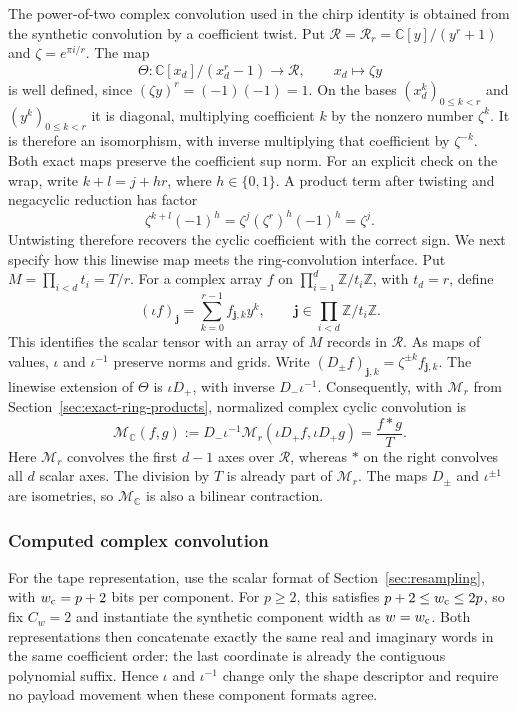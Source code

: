 The power-of-two complex convolution used in the chirp identity is
obtained from the synthetic convolution by a coefficient twist.
Put $\mathcal R=\mathcal R_r=\mathbb C[y]/(y^r+1)$ and
$\zeta=e^{\pi i/r}$.  The map
\[
 \Theta:\mathbb C[x_d]/(x_d^r-1)\longrightarrow\mathcal R,
 \qquad x_d\longmapsto\zeta y
\]
is well defined, since $(\zeta y)^r=(-1)(-1)=1$.  On the bases
$(x_d^k)_{0\le k<r}$ and $(y^k)_{0\le k<r}$ it is diagonal,
multiplying coefficient $k$ by the nonzero number $\zeta^k$.  It is therefore an
isomorphism, with inverse multiplying that coefficient by
$\zeta^{-k}$.  Both exact maps preserve the coefficient sup norm.
For an explicit check on the wrap, write $k+l=j+hr$, where
$h\in\{0,1\}$.  A product term after twisting and negacyclic reduction
has factor
\[
 \zeta^{k+l}(-1)^h=\zeta^j(\zeta^r)^h(-1)^h=\zeta^j.
\]
Untwisting therefore recovers the cyclic coefficient with the correct
sign.  We next specify how this linewise map meets the ring-convolution
interface.  Put $M=\prod_{i<d}t_i=T/r$.  For a complex array $f$ on
$\prod_{i=1}^d\mathbb Z/t_i\mathbb Z$, with $t_d=r$, define
\[
 (\iota f)_{\boldsymbol j}
   =\sum_{k=0}^{r-1}f_{\boldsymbol j,k}y^k,
 \qquad
 \boldsymbol j\in\prod_{i<d}\mathbb Z/t_i\mathbb Z.
\]
This identifies the scalar tensor with an array of $M$ records in
$\mathcal R$. As maps of values, $\iota$ and $\iota^{-1}$ preserve norms
and grids. Write
$(D_\pm f)_{\boldsymbol j,k}=\zeta^{\pm k}f_{\boldsymbol j,k}$.
The linewise extension of $\Theta$ is $\iota D_+$, with inverse
$D_-\iota^{-1}$.  Consequently, with $\mathcal M_r$ from
Section~\ref{sec:exact-ring-products}, normalized complex cyclic
convolution is
\[
 \mathcal M_{\mathbb C}(f,g)
   :=D_-\iota^{-1}
       \mathcal M_r(\iota D_+f,\iota D_+g)
    =\frac{f*g}{T}.
\]
Here $\mathcal M_r$ convolves the first $d-1$ axes over $\mathcal R$,
whereas $*$ on the right convolves all $d$ scalar axes.  The division
by $T$ is already part of $\mathcal M_r$.  The maps $D_\pm$ and
$\iota^{\pm1}$ are isometries, so $\mathcal M_{\mathbb C}$ is also a
bilinear contraction.

\subsubsection{Computed complex convolution}

For the tape representation, use the scalar format of
Section~\ref{sec:resampling}, with $w_{\rm c}=p+2$ bits per component.
For $p\geq2$, this satisfies $p+2\leq w_{\rm c}\leq2p$, so fix $C_w=2$
and instantiate the synthetic component width as $w=w_{\rm c}$.
Both representations then concatenate exactly the same real and
imaginary words in the same coefficient order: the last coordinate is
already the contiguous polynomial suffix. Hence $\iota$ and
$\iota^{-1}$ change only the shape descriptor and require no payload
movement when these component formats agree.

